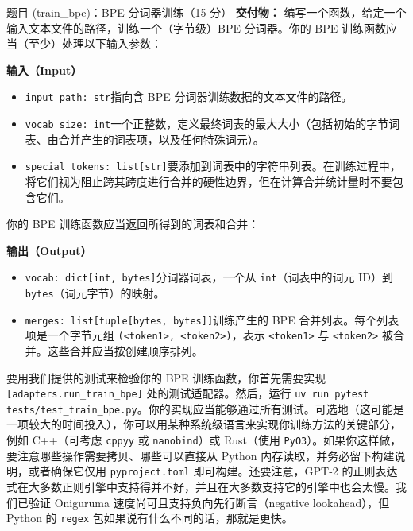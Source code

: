 \begin{problembox}{题目 (train\_bpe)：BPE 分词器训练（15 分）}
\textbf{交付物：} 编写一个函数，给定一个输入文本文件的路径，训练一个（字节级）BPE 分词器。你的 BPE 训练函数应当（至少）处理以下输入参数：

\textbf{输入（Input）}
\begin{itemize}[leftmargin=2em]
\item \texttt{input\_path: str}\quad 指向含 BPE 分词器训练数据的文本文件的路径。
\item \texttt{vocab\_size: int}\quad 一个正整数，定义最终词表的最大大小（包括初始的字节词表、由合并产生的词表项，以及任何特殊词元）。
\item \texttt{special\_tokens: list[str]}\quad 要添加到词表中的字符串列表。在训练过程中，将它们视为阻止跨其跨度进行合并的硬性边界，但在计算合并统计量时不要包含它们。
\end{itemize}

你的 BPE 训练函数应当返回所得到的词表和合并：

\textbf{输出（Output）}
\begin{itemize}[leftmargin=2em]
\item \texttt{vocab: dict[int, bytes]}\quad 分词器词表，一个从 \texttt{int}（词表中的词元 ID）到 \texttt{bytes}（词元字节）的映射。
\item \texttt{merges: list[tuple[bytes, bytes]]}\quad 训练产生的 BPE 合并列表。每个列表项是一个字节元组 \texttt{(<token1>, <token2>)}，表示 \texttt{<token1>} 与 \texttt{<token2>} 被合并。这些合并应当按创建顺序排列。
\end{itemize}

要用我们提供的测试来检验你的 BPE 训练函数，你首先需要实现 \texttt{[adapters.run\_train\_bpe]} 处的测试适配器。然后，运行 \texttt{uv run pytest tests/test\_train\_bpe.py}。你的实现应当能够通过所有测试。可选地（这可能是一项较大的时间投入），你可以用某种系统级语言来实现你训练方法的关键部分，例如 C++（可考虑 \texttt{cppyy} 或 \texttt{nanobind}）或 Rust（使用 \texttt{PyO3}）。如果你这样做，要注意哪些操作需要拷贝、哪些可以直接从 Python 内存读取，并务必留下构建说明，或者确保它仅用 \texttt{pyproject.toml} 即可构建。还要注意，GPT-2 的正则表达式在大多数正则引擎中支持得并不好，并且在大多数支持它的引擎中也会太慢。我们已验证 Oniguruma 速度尚可且支持负向先行断言（negative lookahead），但 Python 的 \texttt{regex} 包如果说有什么不同的话，那就是更快。
\end{problembox}

